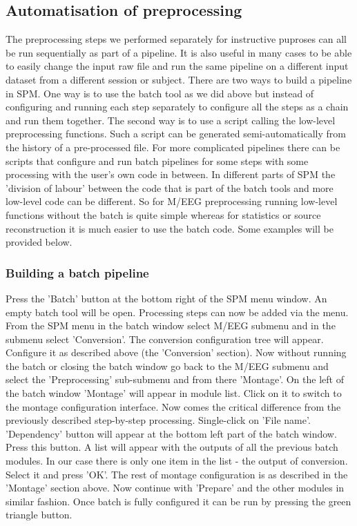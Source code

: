 \subsection{Automatisation of preprocessing}
The preprocessing steps we performed separately for instructive puproses can all be run sequentially as part of a pipeline. It is also useful in many cases to be able to easily change the input raw file and run the same pipeline on a different input dataset from a different session or subject. There are two ways to build a pipeline in SPM. One way is to use the batch tool as we did above but instead of configuring and running each step separately to configure all the steps as a chain and run them together. The second way is to use a script calling the low-level preprocessing functions. Such a script can be generated semi-automatically from the history of a pre-processed file. For more complicated pipelines there can be scripts that configure and run batch pipelines for some steps with some processing with the user's own code in between. In different parts of SPM the 'division of labour' between the code that is part of the batch tools and more low-level code can be different. So for M/EEG preprocessing running low-level functions without the batch is quite simple whereas for statistics or source reconstruction it is much easier to use the batch code. Some examples will be provided below. 

\subsubsection{Building a batch pipeline}
Press the 'Batch' button at the bottom right of the SPM menu window.  An empty batch tool will be open. Processing steps can now be added via the menu. From the SPM menu in the batch window select M/EEG submenu and in the submenu select 'Conversion'. The conversion configuration tree will appear. Configure it as described above (the 'Conversion' section).  Now without running the batch or closing the batch window go back to the M/EEG submenu and select the 'Preprocessing' sub-submenu and from there 'Montage'.  On the left of the batch window 'Montage' will appear in module list.  Click on it to switch to the montage configuration interface.  Now comes the critical difference from the previously described step-by-step processing. Single-click on 'File name'. 'Dependency' button will appear at the bottom left part of the batch window. Press this button. A list will appear with the outputs of all the previous batch modules. In our case there is only one item in the list - the output of conversion. Select it and press 'OK'. The rest of montage configuration is as described in the 'Montage' section above. Now continue with 'Prepare' and the other modules in similar fashion. Once batch is fully configured it can be run by pressing the green triangle button. 

